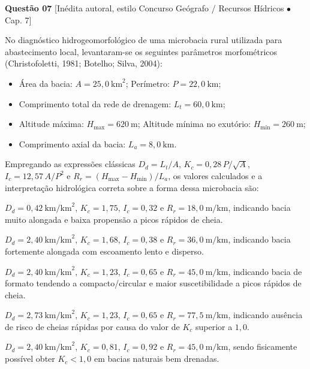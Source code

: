 \noindent\textbf{Questão 07} {\footnotesize\color{uefsMuted}[Inédita autoral, estilo Concurso Geógrafo / Recursos Hídricos $\bullet$ Cap. 7]}\par
No diagnóstico hidrogeomorfológico de uma microbacia rural utilizada para abastecimento local, levantaram-se os seguintes parâmetros morfométricos (Christofoletti, 1981; Botelho; Silva, 2004):
\begin{itemize}[leftmargin=1.8em, itemsep=1.5pt, topsep=3pt]
  \item Área da bacia: $A = 25,0\ \text{km}^2$; \quad Perímetro: $P = 22,0\ \text{km}$;
  \item Comprimento total da rede de drenagem: $L_t = 60,0\ \text{km}$;
  \item Altitude máxima: $H_{\max} = 620\ \text{m}$; \quad Altitude mínima no exutório: $H_{\min} = 260\ \text{m}$;
  \item Comprimento axial da bacia: $L_a = 8,0\ \text{km}$.
\end{itemize}
Empregando as expressões clássicas $D_d = L_t / A$, $K_c = 0,28\,P/\sqrt{A}$, $I_c = 12,57\,A/P^2$ e $R_r = (H_{\max} - H_{\min})/L_a$, os valores calculados e a interpretação hidrológica correta sobre a forma dessa microbacia são:
\begin{alternativas}
  \item $D_d = 0,42\ \text{km/km}^2$, $K_c = 1,75$, $I_c = 0,32$ e $R_r = 18,0\ \text{m/km}$, indicando bacia muito alongada e baixa propensão a picos rápidos de cheia.
  \item $D_d = 2,40\ \text{km/km}^2$, $K_c = 1,68$, $I_c = 0,38$ e $R_r = 36,0\ \text{m/km}$, indicando bacia fortemente alongada com escoamento lento e disperso.
  \item $D_d = 2,40\ \text{km/km}^2$, $K_c = 1,23$, $I_c = 0,65$ e $R_r = 45,0\ \text{m/km}$, indicando bacia de formato tendendo a compacto/circular e maior suscetibilidade a picos rápidos de cheia.
  \item $D_d = 2,73\ \text{km/km}^2$, $K_c = 1,23$, $I_c = 0,65$ e $R_r = 77,5\ \text{m/km}$, indicando ausência de risco de cheias rápidas por causa do valor de $K_c$ superior a $1,0$.
  \item $D_d = 2,40\ \text{km/km}^2$, $K_c = 0,81$, $I_c = 0,92$ e $R_r = 45,0\ \text{m/km}$, sendo fisicamente possível obter $K_c < 1,0$ em bacias naturais bem drenadas.
\end{alternativas}

